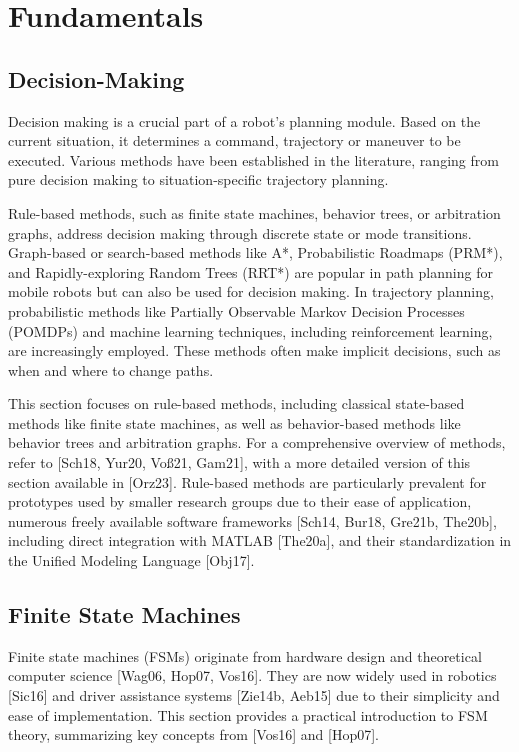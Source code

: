 
\section{Fundamentals}

\subsection{Decision-Making}

Decision making is a crucial part of a robot's planning module.
Based on the current situation, it determines a command, trajectory or maneuver to be executed.
Various methods have been established in the literature, ranging from pure decision making to situation-specific trajectory planning.

Rule-based methods, such as finite state machines, behavior trees, or arbitration graphs, address decision making through discrete state or mode transitions.
Graph-based or search-based methods like A*, Probabilistic Roadmaps (PRM*), and Rapidly-exploring Random Trees (RRT*) are popular in path planning for mobile robots but can also be used for decision making.
In trajectory planning, probabilistic methods like Partially Observable Markov Decision Processes (POMDPs) and machine learning techniques, including reinforcement learning, are increasingly employed.
These methods often make implicit decisions, such as when and where to change paths.

This section focuses on rule-based methods, including classical state-based methods like finite state machines, as well as behavior-based methods like behavior trees and arbitration graphs.
For a comprehensive overview of methods, refer to [Sch18, Yur20, Voß21, Gam21], with a more detailed version of this section available in [Orz23].
Rule-based methods are particularly prevalent for prototypes used by smaller research groups due to their ease of application, numerous freely available software frameworks [Sch14, Bur18, Gre21b, The20b], including direct integration with MATLAB [The20a], and their standardization in the Unified Modeling Language [Obj17].

\subsection{Finite State Machines}
Finite state machines (FSMs) originate from hardware design and theoretical computer science [Wag06, Hop07, Vos16].
They are now widely used in robotics [Sic16] and driver assistance systems [Zie14b, Aeb15] due to their simplicity and ease of implementation.
This section provides a practical introduction to FSM theory, summarizing key concepts from [Vos16] and [Hop07].


